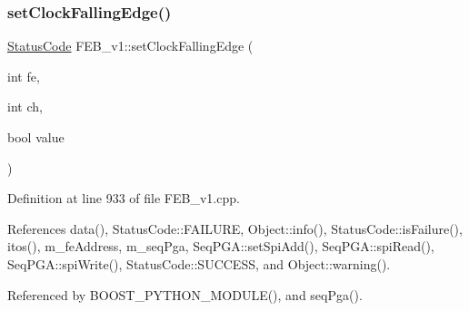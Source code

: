 \subsubsection{\texorpdfstring{set\+Clock\+Falling\+Edge()}{setClockFallingEdge()}}
{\footnotesize\ttfamily \hyperlink{classStatusCode}{Status\+Code} F\+E\+B\+\_\+v1\+::set\+Clock\+Falling\+Edge (\begin{DoxyParamCaption}\item[{int}]{fe,  }\item[{int}]{ch,  }\item[{bool}]{value }\end{DoxyParamCaption})}



Definition at line 933 of file F\+E\+B\+\_\+v1.\+cpp.



References data(), Status\+Code\+::\+F\+A\+I\+L\+U\+RE, Object\+::info(), Status\+Code\+::is\+Failure(), itos(), m\+\_\+fe\+Address, m\+\_\+seq\+Pga, Seq\+P\+G\+A\+::set\+Spi\+Add(), Seq\+P\+G\+A\+::spi\+Read(), Seq\+P\+G\+A\+::spi\+Write(), Status\+Code\+::\+S\+U\+C\+C\+E\+SS, and Object\+::warning().



Referenced by B\+O\+O\+S\+T\+\_\+\+P\+Y\+T\+H\+O\+N\+\_\+\+M\+O\+D\+U\+L\+E(), and seq\+Pga().


